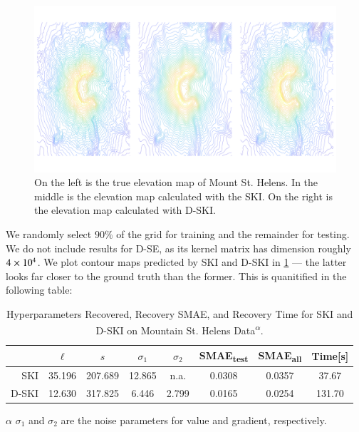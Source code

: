\begin{figure}[ht]
  \begin{center}
    \includegraphics[width=\textwidth, height=0.47\textwidth, trim = 0cm 0cm 0cm
    0cm,clip]{./sgpd/pics/mountainContour}
    \caption{On the left is the true elevation map of Mount St. Helens. In the
    middle is the elevation map calculated with the SKI. On the right is the
    elevation map calculated with D-SKI.}\label{fig:MtSH_map}
  \end{center}
\end{figure}

We randomly select $90\%$ of the grid for training and the remainder for
testing. We do not include results for D-SE, as its kernel matrix has dimension
roughly $4\mathrel{\times}10^4$. We plot contour maps predicted by SKI and D-SKI
in \cref{fig:MtSH_map} --- the latter looks far closer to the ground truth
than the former. This is quanitified in the following table:

\begin{table}[ht]
  \centering
  \caption{Hyperparameters Recovered, Recovery SMAE, and Recovery Time for SKI
  and D-SKI on Mountain St. Helens Data\textsuperscript{$\alpha$}.}
  \label{tab:mtsthelens}
  \begin{threeparttable}
    \begin{tabular}{r c c c c c c c}
      \toprule
      & $\ell$ & $s$ & $\sigma_1$ & $\sigma_2$ & SMAE\textsubscript{test} &
      SMAE\textsubscript{all} & Time[s]\\ \midrule
      SKI & 35.196 & 207.689 & 12.865 & n.a. & 0.0308 & 0.0357 & 37.67\\
      D-SKI & 12.630 & 317.825 & 6.446 & 2.799 & 0.0165 & 0.0254 & 131.70\\
      \bottomrule
    \end{tabular}
    \begin{tablenotes}
      \item[$\alpha$] $\sigma_1$ and $\sigma_2$ are the noise parameters for
      value and gradient, respectively.
    \end{tablenotes}
  \end{threeparttable}
\end{table}

